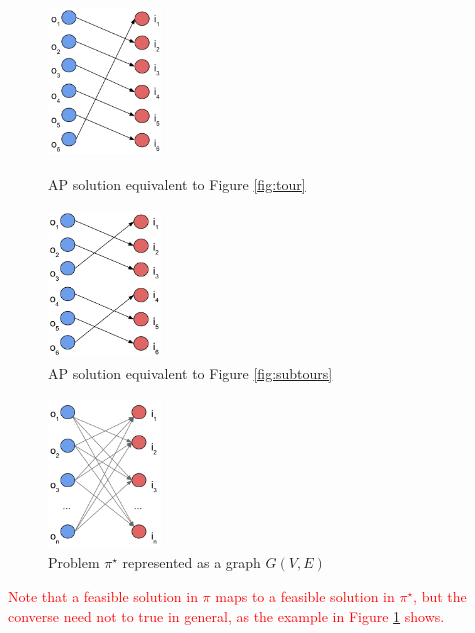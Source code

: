 \documentclass{mprop}
\theoremstyle{definition}
\begin{document}
\begin{figure}
\centering
\begin{minipage}{.5\textwidth}
\centering
 \includegraphics[width=3cm, height=4cm]{images/validAP.png}
 \caption{AP solution equivalent to Figure \ref{fig:tour}}
 \label{fig:validAP}
\end{minipage}%
\begin{minipage}{.5\textwidth}
\centering
 \includegraphics[width=3cm, height=4cm]{images/invalidAP.png}
 \caption{AP solution equivalent to Figure \ref{fig:subtours}}
 \label{fig:invalidAP}
\end{minipage}
\end{figure}

\begin{figure}
\centering
\includegraphics[width = 3cm, height = 4cm]{images/tspbipartite.png}
\caption{Problem $\pi^{\star}$ represented as a graph $G(V,E)$}
\label{fig:tspbipartite}
\end{figure}

\textcolor{red}{
Note that 
a feasible solution in $\pi$ maps to a feasible solution in $\pi^{\star}$, but the converse need not to true in general, as the example in Figure \ref{fig:invalidAP} shows.
}
\end{document}
